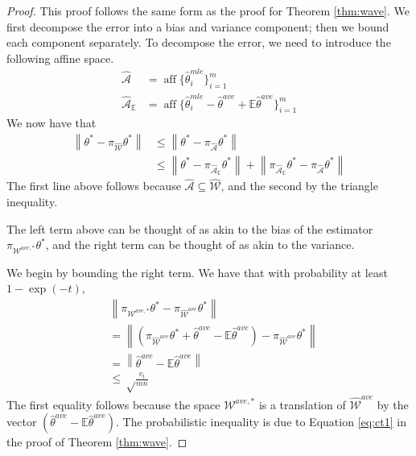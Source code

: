 \documentclass[twoside]{article}
\DeclareMathOperator*{\affspan}{aff}
\newcommand{\W}{\mathcal{\hat W}}
\newcommand{\Waff}{\mathcal{\hat A}}
\newcommand{\Wave}{{\mathcal{\hat W}^{ave}}}
\newcommand{\Wtave}{{\mathcal{W}^{ave,*}}}
\newcommand{\E}{\mathbb{E}}
\newcommand{\x}{\mathbf{x}}
\newcommand{\w}{\theta}
\newcommand{\wave}{\hat\w^{ave}}
\newcommand{\wtave}{\E\hat\w^{ave}}
\newcommand{\wmle}{\hat\w^{mle}}
\newcommand{\wstar}{{\w^{*}}}
\newcommand{\ltwo}[1]{{\left\lVert {#1} \right\rVert}}
\newcommand{\proj}[1]{\pi_{{#1}}}
\begin{document}
\begin{proof}
This proof follows the same form as the proof for Theorem \ref{thm:wave}.
We first decompose the error into a bias and variance component;
then we bound each component separately.
To decompose the error, we need to introduce the following affine space.
\begin{align}
\Waff&=\affspan \{\wmle_i\}_{i=1}^m
\\
\Waff_{\E}&=\affspan \{\wmle_i - \wave + \E\wave\}_{i=1}^m
\end{align}
We now have that
\begin{align}
\ltwo{\wstar-\proj\W\wstar}
&\le
\ltwo{\wstar-\proj\Waff\wstar}
\\
&\le
\ltwo{\wstar-\proj{\Waff_\E}\wstar}
+
\ltwo{\proj{\Waff_\E}\wstar-\proj\Waff\wstar}
\end{align}
The first line above follows because $\Waff\subseteq\W$,
and the second by the triangle inequality.

The left term above can be thought of as akin to the bias of the estimator $\proj\Wtave\wstar$,
and the right term can be thought of as akin to the variance.

We begin by bounding the right term.
We have that with probability at least $1-\exp(-t)$,
\begin{align}
&\ltwo{\proj\Wtave\wstar-\proj\Wave\wstar}
\\
&=
\ltwo{(\proj\Wave\wstar+\wave-\wtave)-\proj\Wave\wstar}
\\&=
\ltwo{\wave-\wtave}
\\&\le
\sqrt\frac{v_t}{mn}
\end{align}
The first equality follows because the space $\Wtave$ is a translation of $\Wave$ by the vector $(\wave-\wtave)$.
The probabilistic inequality is due to Equation \ref{eq:ct1} in the proof of Theorem \ref{thm:wave}.


\end{proof}
\end{document}
